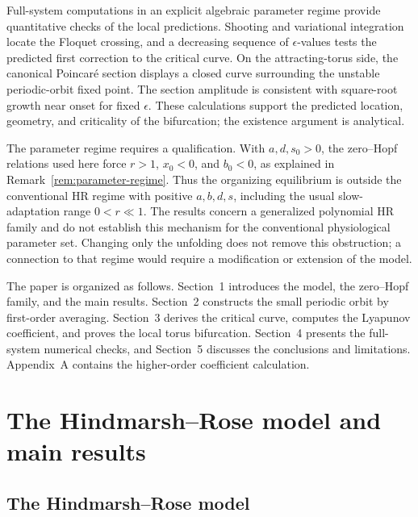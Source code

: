 \documentclass[11pt]{amsart}
\theoremstyle{remark}
\begin{document}
Full-system computations in an explicit algebraic parameter regime
provide quantitative checks of the local predictions. Shooting and
variational integration locate the Floquet crossing, and a decreasing
sequence of \(\epsilon\)-values tests the predicted first correction
to the critical curve. On the attracting-torus side, the canonical
Poincar\'e section displays a closed curve surrounding the unstable
periodic-orbit fixed point. The section amplitude is consistent with
square-root growth near onset for fixed \(\epsilon\). These calculations
support the predicted location, geometry, and criticality of the
bifurcation; the existence argument is analytical.

The parameter regime requires a qualification. With
\(a,d,s_0>0\), the zero--Hopf relations used here force
\(r>1\), \(x_0<0\), and \(b_0<0\), as explained in
Remark~\ref{rem:parameter-regime}. Thus the organizing equilibrium
is outside the conventional HR regime with positive
\(a,b,d,s\), including the usual slow-adaptation range
\(0<r\ll1\). The results concern a generalized polynomial HR family
and do not establish this mechanism for the conventional physiological
parameter set. Changing only the unfolding does not remove this
obstruction; a connection to that regime would require a modification
or extension of the model.

The paper is organized as follows. Section~1 introduces the model,
the zero--Hopf family, and the main results. Section~2 constructs
the small periodic orbit by first-order averaging. Section~3 derives
the critical curve, computes the Lyapunov coefficient, and proves
the local torus bifurcation. Section~4 presents the full-system
numerical checks, and Section~5 discusses the conclusions and
limitations. Appendix~A contains the higher-order coefficient
calculation.


\section{The Hindmarsh--Rose model and main results}

\subsection{The Hindmarsh--Rose model}
\end{document}

